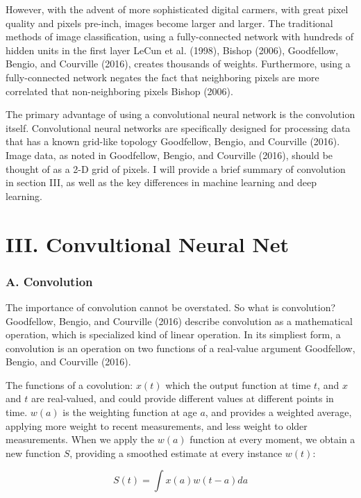 \documentclass[conference,final,]{IEEEtran}
\begin{document}
However, with the advent of more sophisticated digital carmers, with
great pixel quality and pixels pre-inch, images become larger and
larger. The traditional methods of image classification, using a
fully-connected network with hundreds of hidden units in the first layer
LeCun et al. (1998), Bishop (2006), Goodfellow, Bengio, and Courville
(2016), creates thousands of weights. Furthermore, using a
fully-connected network negates the fact that neighboring pixels are
more correlated that non-neighboring pixels Bishop (2006).

The primary advantage of using a convolutional neural network is the
convolution itself. Convolutional neural networks are specifically
designed for processing data that has a known grid-like topology
Goodfellow, Bengio, and Courville (2016). Image data, as noted in
Goodfellow, Bengio, and Courville (2016), should be thought of as a 2-D
grid of pixels. I will provide a brief summary of convolution in section
III, as well as the key differences in machine learning and deep
learning.

\section{III. Convultional Neural
Net}\label{iii.-convultional-neural-net}

\subsubsection{A. Convolution}\label{a.-convolution}

The importance of convolution cannot be overstated. So what is
convolution? Goodfellow, Bengio, and Courville (2016) describe
convolution as a mathematical operation, which is specialized kind of
linear operation. In its simpliest form, a convolution is an operation
on two functions of a real-value argument Goodfellow, Bengio, and
Courville (2016).

The functions of a covolution: \(x(t)\) which the output function at
time \(t\), and \(x\) and \(t\) are real-valued, and could provide
different values at different points in time. \(w(a)\) is the weighting
function at age \(a\), and provides a weighted average, applying more
weight to recent measurements, and less weight to older measurements.
When we apply the \(w(a)\) function at every moment, we obtain a new
function \(S\), providing a smoothed estimate at every instance
\(w(t)\):

\begin{equation}
    S(t) = \int x(a)w(t-a)da
\end{equation}
\end{document}

